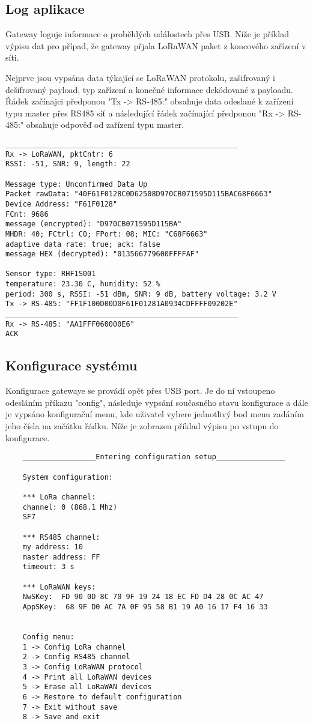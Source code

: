 \subsection{Log aplikace}
Gateway loguje informace o proběhlých událostech přes USB. 
Níže je příklad výpisu dat pro případ, že gateway přjala LoRaWAN paket z koncového zařízení v síti.

Nejprve jsou vypsána data týkající se LoRaWAN protokolu, zašifrovaný i dešifrovaný payload, typ zařízení a konečné informace dekódované z payloadu.
Řádek začínajci předponou "Tx -> RS-485:" obsahuje data odeslané k zařízení typu master přes RS485 síť a následující řádek začínající předponou "Rx -> RS-485:" obsahuje odpověď od zařízení typu master.

\begin{lstlisting}
______________________________________________________
Rx -> LoRaWAN, pktCntr: 6
RSSI: -51, SNR: 9, length: 22

Message type: Unconfirmed Data Up
Packet rawData: "40F61F0128C0D62508D970CB071595D115BAC68F6663"
Device Address: "F61F0128"
FCnt: 9686
message (encrypted): "D970CB071595D115BA"
MHDR: 40; FCtrl: C0; FPort: 08; MIC: "C68F6663"
adaptive data rate: true; ack: false
message HEX (decrypted): "013566779600FFFFAF"

Sensor type: RHF1S001
temperature: 23.30 C, humidity: 52 %
period: 300 s, RSSI: -51 dBm, SNR: 9 dB, battery voltage: 3.2 V
Tx -> RS-485: "FF1F100D00D0F61F01281A0934CDFFFF09202E"
______________________________________________________
Rx -> RS-485: "AA1FFF060000E6"
ACK
\end{lstlisting}

\subsection{Konfigurace systému}
\label{sec:konfigurace}
Konfigurace gatewaye se provádí opět přes USB port. Je do ní vstoupeno odesláním příkazu
"config", následuje vypsání současného stavu konfigurace a dále je vypsáno konfigurační menu, kde uživatel vybere jednotlivý bod menu zadáním jeho čísla na začátku řádku.
Níže je zobrazen příklad výpisu po vstupu do konfigurace.

\begin{lstlisting}
    _________________Entering configuration setup________________
    
    System configuration:
    
    *** LoRa channel: 
    channel: 0 (868.1 Mhz)
    SF7
    
    *** RS485 channel: 
    my address: 10
    master address: FF
    timeout: 3 s
    
    *** LoRaWAN keys: 
    NwSKey:  FD 90 0D 8C 70 9F 19 24 18 EC FD D4 28 0C AC 47
    AppSKey:  68 9F D0 AC 7A 0F 95 58 B1 19 A0 16 17 F4 16 33
    
    
    Config menu:
    1 -> Config LoRa channel
    2 -> Config RS485 channel
    3 -> Config LoRaWAN protocol
    4 -> Print all LoRaWAN devices
    5 -> Erase all LoRaWAN devices
    6 -> Restore to default configuration
    7 -> Exit without save
    8 -> Save and exit
\end{lstlisting}


